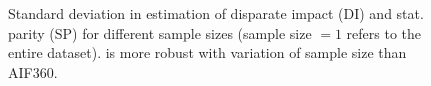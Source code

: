 \begin{figure}
	\centering
			\caption{Standard deviation in estimation of disparate impact (DI) and stat. parity (SP)  for different sample sizes (sample size $ = 1 $ refers to the entire dataset). {\justicia} is more robust with variation of sample size than  AIF360. }
	\label{fairness_justicia_fig:sample-size}
\end{figure}



